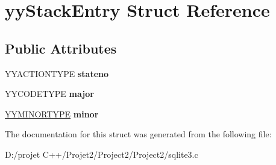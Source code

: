 \hypertarget{structyy_stack_entry}{}\section{yy\+Stack\+Entry Struct Reference}
\label{structyy_stack_entry}
\subsection*{Public Attributes}
\begin{DoxyCompactItemize}
\item 
\mbox{\label{structyy_stack_entry_a108164609c2e841577cc3533d8f0180d}} 
Y\+Y\+A\+C\+T\+I\+O\+N\+T\+Y\+PE {\bfseries stateno}
\item 
\mbox{\label{structyy_stack_entry_a7624d02bcf945d48068f4c383551725c}} 
Y\+Y\+C\+O\+D\+E\+T\+Y\+PE {\bfseries major}
\item 
\mbox{\label{structyy_stack_entry_a024e1e64bce5945080629a2dd8d1bb4f}} 
\mbox{\hyperlink{union_y_y_m_i_n_o_r_t_y_p_e}{Y\+Y\+M\+I\+N\+O\+R\+T\+Y\+PE}} {\bfseries minor}
\end{DoxyCompactItemize}


The documentation for this struct was generated from the following file\+:\begin{DoxyCompactItemize}
\item 
D\+:/projet C++/\+Projet2/\+Project2/\+Project2/sqlite3.\+c\end{DoxyCompactItemize}
